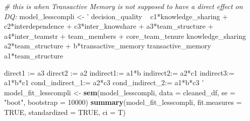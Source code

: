 \documentclass[]{article}
\newenvironment{Shaded}{\begin{snugshade}}{\end{snugshade}}
\newcommand{\CommentTok}[1]{\textcolor[rgb]{0.56,0.35,0.01}{\textit{#1}}}
\newcommand{\DataTypeTok}[1]{\textcolor[rgb]{0.13,0.29,0.53}{#1}}
\newcommand{\DecValTok}[1]{\textcolor[rgb]{0.00,0.00,0.81}{#1}}
\newcommand{\KeywordTok}[1]{\textcolor[rgb]{0.13,0.29,0.53}{\textbf{#1}}}
\newcommand{\NormalTok}[1]{#1}
\newcommand{\OtherTok}[1]{\textcolor[rgb]{0.56,0.35,0.01}{#1}}
\newcommand{\StringTok}[1]{\textcolor[rgb]{0.31,0.60,0.02}{#1}}
\begin{document}
\begin{Shaded}
\begin{Highlighting}[]
\CommentTok{# this is when Transactive Memory is not supposed to have a direct effect on DQ:}
\NormalTok{model_lesscompli <-}\StringTok{ '}
\StringTok{decision_quality ~ c1*knowledge_sharing + c2*interdependence + c3*inter_knowshare + a3*team_structure + a4*inter_teamstr + team_members + core_team_tenure}
\StringTok{knowledge_sharing ~ a2*team_structure + b*transactive_memory}
\StringTok{transactive_memory ~ a1*team_structure}

\StringTok{direct1 := a3}
\StringTok{direct2 := a2}
\StringTok{indirect1:= a1*b}
\StringTok{indirect2:= a2*c1}
\StringTok{indirect3:= a1*b*c1}
\StringTok{cond_indirect_1:= a2*c3}
\StringTok{cond_indirect_2:= a1*b*c3}
\StringTok{'}
\NormalTok{model_fit_lesscompli <-}\StringTok{ }\KeywordTok{sem}\NormalTok{(model_lesscompli, }\DataTypeTok{data =}\NormalTok{ cleaned_df, }\DataTypeTok{se =} \StringTok{"boot"}\NormalTok{, }\DataTypeTok{bootstrap =} \DecValTok{10000}\NormalTok{)}
\KeywordTok{summary}\NormalTok{(model_fit_lesscompli, }\DataTypeTok{fit.measures =} \OtherTok{TRUE}\NormalTok{, }\DataTypeTok{standardized =} \OtherTok{TRUE}\NormalTok{, }\DataTypeTok{ci =}\NormalTok{ T)}
\end{Highlighting}
\end{Shaded}
\end{document}
